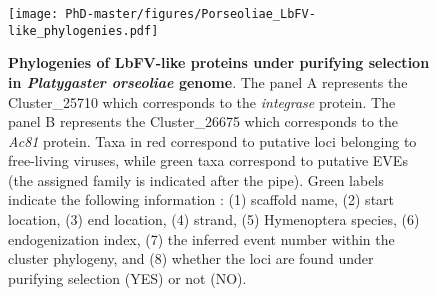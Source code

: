 \begin{figure}[!htpbt]
\texttt{[image: PhD-master/figures/Porseoliae\_LbFV-like\_phylogenies.pdf]}\centering
\caption[Paper1:\textit{P. orseoliae} integrase and Ac81 EVE phylogenies]{\textbf{Phylogenies of LbFV-like proteins under purifying selection in \textit{Platygaster orseoliae} genome}. The panel A represents the Cluster\_25710 which corresponds to the \textit{integrase} protein. The panel B represents the Cluster\_26675 which corresponds to the \textit{Ac81} protein. Taxa in red correspond to putative  loci belonging to free-living viruses, while green taxa correspond to putative EVEs (the assigned family is indicated after the pipe). Green labels indicate the following information : (1) scaffold name, (2) start location, (3) end location, (4) strand, (5) Hymenoptera species, (6) endogenization index, (7) the inferred event number within the cluster phylogeny, and (8) whether the loci are found under purifying selection (YES) or not (NO).}
\label{figure:Porseoliae_LbFV-like_phylogenies}
\end{figure}





